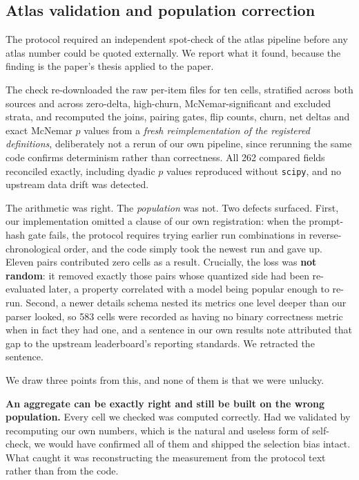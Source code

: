 \subsection{Atlas validation and population correction}
\label{app:prereg-spotcheck}

The protocol required an independent spot-check of the atlas pipeline before any
atlas number could be quoted externally. We report what it found, because the
finding is the paper's thesis applied to the paper.

The check re-downloaded the raw per-item files for ten cells, stratified across
both sources and across zero-delta, high-churn, McNemar-significant and excluded
strata, and recomputed the joins, pairing gates, flip counts, churn, net deltas
and exact McNemar $p$ values from a \emph{fresh reimplementation of the
registered definitions}, deliberately not a rerun of our own pipeline, since
rerunning the same code confirms determinism rather than correctness. All
262 compared fields reconciled exactly, including dyadic $p$ values reproduced
without \texttt{scipy}, and no upstream data drift was detected.

The arithmetic was right. The \emph{population} was not. Two defects surfaced.
First, our implementation omitted a clause of our own registration: when the
prompt-hash gate fails, the protocol requires trying earlier run combinations in
reverse-chronological order, and the code simply took the newest run and gave
up. Eleven pairs contributed zero cells as a result. Crucially, the loss was
\textbf{not random}: it removed exactly those pairs whose quantized side had
been re-evaluated later, a property correlated with a model being popular enough
to re-run. Second, a newer details schema nested its metrics one level deeper
than our parser looked, so 583 cells were recorded as having no binary
correctness metric when in fact they had one, and a sentence in our own results
note attributed that gap to the upstream leaderboard's reporting standards. We
retracted the sentence.

We draw three points from this, and none of them is that we were unlucky.

\textbf{An aggregate can be exactly right and still be built on the wrong
population.} Every cell we checked was computed correctly. Had we validated by
recomputing our own numbers, which is the natural and useless form of
self-check, we would have confirmed all of them and shipped the selection bias intact. What
caught it was reconstructing the measurement from the protocol text rather than
from the code.

